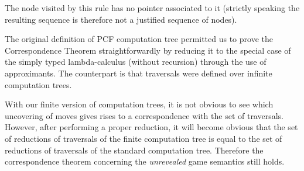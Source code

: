 \documentclass{article}
\begin{document}
The node visited by this rule has no pointer associated to it (strictly speaking the resulting sequence is therefore not a justified sequence of nodes).




The original definition of PCF computation tree permitted us to prove the Correspondence Theorem straightforwardly by reducing it to the special case of the simply typed lambda-calculus (without recursion) through the use of approximants. The counterpart is that traversals were defined over infinite computation trees.

With our finite version of computation trees, it is not obvious to see which uncovering of moves gives rises to a correspondence with the set of traversals.
However, after performing a proper reduction, it will become obvious that the set of reductions of traversals of the finite computation tree is equal to the set of reductions of 
traversals of the standard computation tree.
Therefore the correspondence theorem concerning the \emph{unrevealed} game semantics still holds.

%
%
%
%
%
%
%
\end{document}
